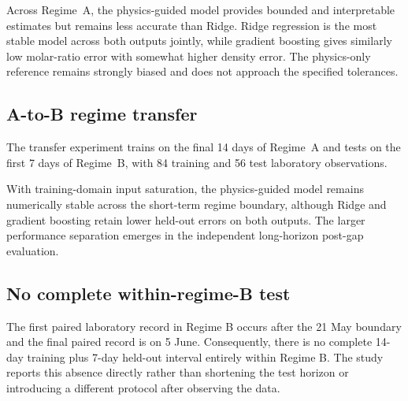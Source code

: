 \documentclass[11pt]{article}
\begin{document}
Across Regime~A, the physics-guided model provides bounded and interpretable estimates but remains less accurate than Ridge. Ridge regression is the most stable model across both outputs jointly, while gradient boosting gives similarly low molar-ratio error with somewhat higher density error. The physics-only reference remains strongly biased and does not approach the specified tolerances.

\subsection{A-to-B regime transfer}

The transfer experiment trains on the final 14 days of Regime~A and tests on the first 7 days of Regime~B, with 84 training and 56 test laboratory observations.

\begin{table}[htbp]
\centering
\caption{Held-out A-to-B transfer performance. Density errors are in g cm$^{-3}$.}
\label{tab:transfer}
\end{table}

With training-domain input saturation, the physics-guided model remains numerically stable across the short-term regime boundary, although Ridge and gradient boosting retain lower held-out errors on both outputs. The larger performance separation emerges in the independent long-horizon post-gap evaluation.

\subsection{No complete within-regime-B test}

The first paired laboratory record in Regime B occurs after the 21 May boundary and the final paired record is on 5 June. Consequently, there is no complete 14-day training plus 7-day held-out interval entirely within Regime B. The study reports this absence directly rather than shortening the test horizon or introducing a different protocol after observing the data.
\end{document}
